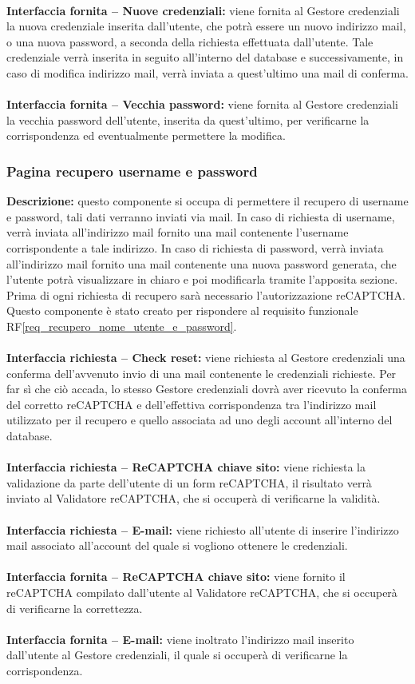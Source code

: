 \\
\textbf{Interfaccia fornita – Nuove credenziali:} viene fornita al Gestore credenziali la nuova credenziale inserita dall’utente, che potrà essere un nuovo indirizzo mail, o una nuova password, a seconda della richiesta effettuata dall’utente. Tale credenziale verrà inserita in seguito all’interno del database e successivamente, in caso di modifica indirizzo mail, verrà inviata a quest’ultimo una mail di conferma. \\
\\
\textbf{Interfaccia fornita – Vecchia password:} viene fornita al Gestore credenziali la vecchia password dell’utente, inserita da quest’ultimo, per verificarne la corrispondenza ed eventualmente permettere la modifica.

\subsubsection{Pagina recupero username e password}
\textbf{Descrizione:} questo componente si occupa di permettere il recupero di username e password, tali dati verranno inviati via mail. In caso di richiesta di username, verrà inviata all’indirizzo mail fornito una mail contenente l’username corrispondente a tale indirizzo. In caso di richiesta di password, verrà inviata all’indirizzo mail fornito una mail contenente una nuova password generata, che l’utente potrà visualizzare in chiaro e poi modificarla tramite l’apposita sezione. Prima di ogni richiesta di recupero sarà necessario l’autorizzazione reCAPTCHA. Questo componente è stato creato per rispondere al requisito funzionale RF\ref{req_recupero_nome_utente_e_password}.\\
\\
\textbf{Interfaccia richiesta – Check reset:} viene richiesta al Gestore credenziali una conferma dell’avvenuto invio di una mail contenente le credenziali richieste. Per far sì che ciò accada, lo stesso Gestore credenziali dovrà aver ricevuto la conferma del corretto reCAPTCHA e dell’effettiva corrispondenza tra l’indirizzo mail utilizzato per il recupero e quello associata ad uno degli account all’interno del database. \\
\\
\textbf{Interfaccia richiesta – ReCAPTCHA chiave sito:} viene richiesta la validazione da parte dell’utente di un form reCAPTCHA, il risultato verrà inviato al Validatore reCAPTCHA, che si occuperà di verificarne la validità. \\
\\
\textbf{Interfaccia richiesta – E-mail:} viene richiesto all’utente di inserire l’indirizzo mail associato all’account del quale si vogliono ottenere le credenziali. \\
\\
\textbf{Interfaccia fornita – ReCAPTCHA chiave sito:} viene fornito il reCAPTCHA compilato dall’utente al Validatore reCAPTCHA, che si occuperà di verificarne la correttezza. \\
\\
\textbf{Interfaccia fornita – E-mail:} viene inoltrato l’indirizzo mail inserito dall’utente al Gestore credenziali, il quale si occuperà di verificarne la corrispondenza.

